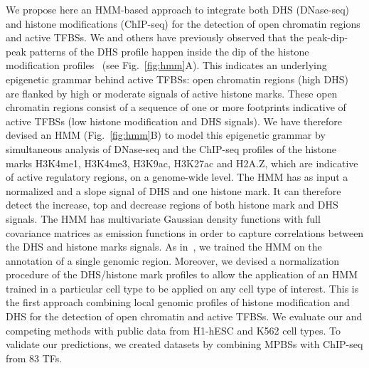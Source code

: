 \documentclass{bioinfo}
\begin{document}
We propose here an HMM-based approach to integrate both DHS (DNase-seq) and histone
modifications (ChIP-seq) for the detection of open chromatin regions and active TFBSs.
We and others have previously observed that the peak-dip-peak patterns of the DHS
profile happen inside the dip of the histone modification profiles~\citep{gusmao2012,kundaje2012}
(see Fig.~\ref{fig:hmm}A). This indicates an underlying epigenetic grammar
behind active TFBSs: open chromatin regions (high DHS) are flanked
by high or moderate signals of active histone marks. These open chromatin regions
consist of a sequence of one or more footprints indicative of active TFBSs (low histone
modification and DHS signals). We have therefore devised an HMM (Fig.~\ref{fig:hmm}B)
to model this epigenetic grammar by simultaneous analysis of DNase-seq and the ChIP-seq
profiles of the histone marks H3K4me1, H3K4me3, H3K9ac, H3K27ac and H2A.Z, which are
indicative of active regulatory regions, on a genome-wide level. The HMM has as input
a normalized and a slope signal of DHS and one histone mark. It can therefore
detect the increase, top and decrease regions of both histone mark and DHS signals.
The HMM has multivariate Gaussian density functions with full covariance matrices as
emission functions in order to capture correlations between the DHS and histone
marks signals. As in~\cite{boyle2011}, we trained the HMM on the annotation of a single
genomic region. Moreover, we devised a normalization procedure of the DHS/histone mark
profiles to allow the application of an HMM trained in a particular cell type to be
applied on any cell type of interest. This is the first approach combining local genomic
profiles of histone modification and DHS for the detection of open chromatin and active
TFBSs. We evaluate our and competing methods with public data from H1-hESC and K562
cell types. To validate our predictions, we created datasets by combining MPBSs with
ChIP-seq from 83 TFs.
\end{document}
